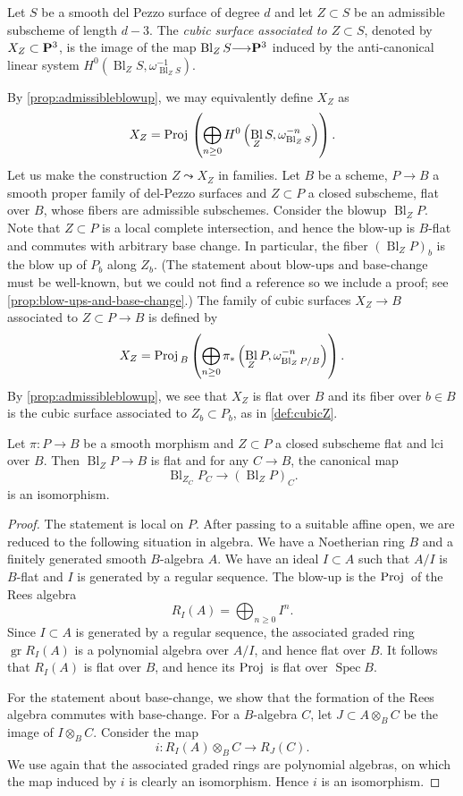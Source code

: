 \documentclass[reqno]{amsart}
\DeclareMathOperator{\Bl}{Bl}
\renewcommand{\to}{{\longrightarrow}}
\renewcommand {\P}{{\bf P}}
\providecommand{\spec}{\operatorname{Spec}}
\numberwithin{equation}{section}
\newcommand{\Proj}{{\text{\rm Proj}\,}}
\begin{document}
\begin{definition}
  \label{def:cubicZ}
  Let $S$ be a smooth del Pezzo surface of degree $d$ and let $Z \subset S$ be an admissible subscheme of length $d-3$.
  The \emph{cubic surface associated to $Z \subset S$}, denoted by
  $X_Z \subset \P^3$, is the image of the map
  $\Bl_{Z}S \to \P^3$ induced by the anti-canonical linear system $H^0\left(\Bl_ZS, \omega_{\Bl_Z S}^{-1}\right)$.
\end{definition}
By \autoref{prop:admissibleblowup}, we may equivalently define $X_Z$ as
\[ X_Z = \Proj \left( \bigoplus_{n \geq 0} H^0\left( \Bl_ZS, \omega_{\Bl_Z S}^{-n} \right) \right).\]
Let us make the construction $Z \leadsto X_Z$ in families.
Let $B$ be a scheme, $P \to B$ a smooth proper family of del-Pezzo surfaces and $Z \subset  P$ a closed subscheme, flat over $B$, whose fibers are admissible subschemes.
Consider the blowup $\Bl_{ Z}  P$.
Note that $Z \subset  P$ is a local complete intersection, and hence the blow-up is $B$-flat and commutes with arbitrary base change.
In particular, the fiber $(\Bl_ZP)_b$ is the blow up of $P_b$ along $Z_b$.
(The statement about blow-ups and base-change must be well-known, but we could not find a reference so we include a proof; see \autoref{prop:blow-ups-and-base-change}.)
The family of cubic surfaces $X_Z \to B$ associated to $Z \subset P \to B$ is defined by
\[
  X_Z = \Proj_B \left(\bigoplus_{n \geq 0}\pi_*\left(\Bl_ZP, \omega_{\Bl_ZP/B}^{-n}\right)\right).
\]
By \autoref{prop:admissibleblowup}, we see that $X_Z$ is flat over $B$
and its fiber over $b \in B$ is the cubic surface associated to
$Z_b \subset P_b$, as in \autoref{def:cubicZ}.
\begin{proposition}\label{prop:blow-ups-and-base-change}
  Let $\pi \colon P \to B$ be a smooth morphism and $Z \subset P$ a closed subscheme flat and lci over $B$.
  Then $\Bl_ZP \to B$ is flat and for any $C \to B$, the canonical map
  \[  \Bl_{Z_C} P_C \to \left(\Bl_ZP\right)_C.\]
  is an isomorphism.
\end{proposition}
\begin{proof}
  The statement is local on $P$.
  After passing to a suitable affine open, we are reduced to the following situation in algebra.
  We have a Noetherian ring $B$ and a finitely generated smooth $B$-algebra $A$.
  We have an ideal $I \subset A$ such that $A/I$ is $B$-flat and $I$ is generated by a regular sequence.
  The blow-up is the $\Proj$ of the Rees algebra
  \[R_I(A) = \bigoplus_{n \geq 0}I^n.\]
  Since $I \subset A$ is generated by a regular sequence, the associated graded ring $\operatorname{gr} R_I(A)$ is a polynomial algebra over $A/I$, and hence flat over $B$.
  It follows that $R_I(A)$ is flat over $B$, and hence its $\Proj$ is flat over $\spec B$.

  For the statement about base-change, we show that the formation of the Rees algebra commutes with base-change.
  For a $B$-algebra $C$, let $J \subset A \otimes_B C$ be the image of $I \otimes_B C$.
  Consider the map
  \[ i \colon R_I(A) \otimes_B C \to R_J(C).\]
  We use again that the associated graded rings are polynomial algebras, on which the map induced by $i$ is clearly an isomorphism.
  Hence $i$ is an isomorphism.
\end{proof}
\end{document}
